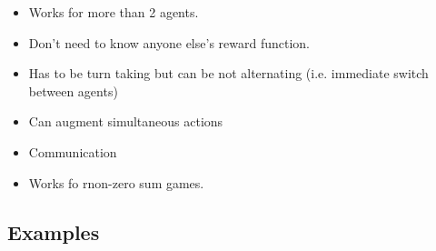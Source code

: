 \begin{warning}
    \begin{itemize}
        \item Works for more than 2 agents. 
        \item Don't need to know anyone else's reward function. 
        \item Has to be turn taking but can be not alternating (i.e. immediate switch between agents)
        \item Can augment simultaneous actions 
        \item Communication 
        \item Works fo rnon-zero sum games. 
    \end{itemize}
\end{warning}
\newpage

\subsection{Examples}
